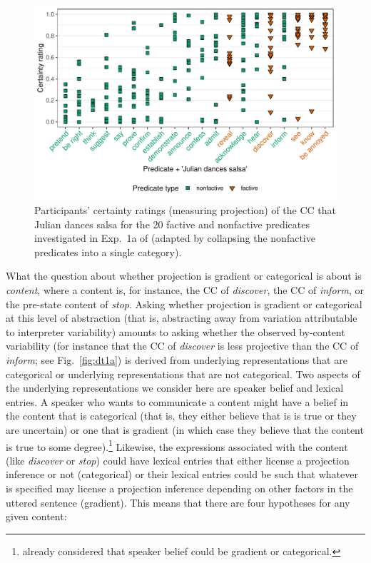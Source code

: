 \documentclass[11pt,fleqn]{article}
\newcommand{\6}{\mbox{$[\hspace*{-.6mm}[$}}
\newcommand{\9}{\mbox{$]\hspace*{-.6mm}]$}}
\begin{document}
\begin{figure}[h!]
\centering
\includegraphics[width=.8\textwidth]{../../results/main/13explicitIgnorance/graphs/mean-certainty-by-predicateType-JULIAN}
\caption{Participants' certainty ratings (measuring projection) of the CC that Julian dances salsa for the 20 \color{orange}factive \color{black} and \color{green}nonfactive \color{black} predicates investigated in Exp.~1a of \citealt{degen-tonhauser-language} (adapted by collapsing the nonfactive predicates into a single category).}\label{fig:dt1a-JULIAN}
\end{figure}

What the question about whether projection is gradient or categorical is about is {\em content}, where a content is, for instance, the CC of {\em discover}, the CC of {\em inform}, or the pre-state content of {\em stop}. Asking whether projection is gradient or categorical at this level of abstraction (that is, abstracting away from variation attributable to interpreter variability) amounts to asking whether the observed by-content variability (for instance that the CC of {\em discover} is less projective than the CC of {\em inform}; see Fig.~\ref{fig:dt1a}) is derived from underlying representations that are categorical or underlying representations that are not categorical. Two aspects of the underlying representations we consider here are speaker belief and lexical entries. A speaker who wants to communicate a content might have a belief in the content that is categorical (that is, they either believe that is is true or they are uncertain) or one that is gradient (in which case they believe that the content is true to some degree).\footnote{\citealt[498f.]{tbd-variability} already considered that speaker belief could be gradient or categorical.} Likewise, the expressions associated with the content (like {\em discover} or {\em stop}) could have lexical entries that either license a projection inference or not (categorical) or their lexical entries could be such that whatever is specified may license a projection inference depending on other factors in the uttered sentence (gradient). This means that there are four hypotheses for any given content:
\end{document}
